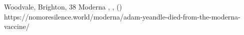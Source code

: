           {Woodvale, Brighton, }
          {38}
          {Moderna}
          {}
          {
            ,
            ,
             ()
          }
          {https://nomoresilence.world/moderna/adam-yeandle-died-from-the-moderna-vaccine/}

